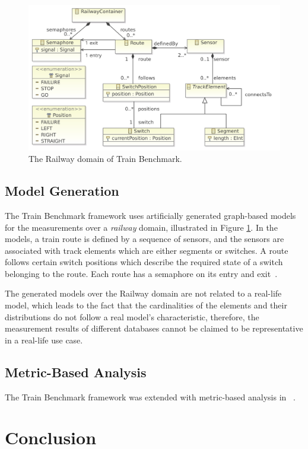 \begin{figure}[!ht]
	\centering
	\includegraphics[width=150mm, keepaspectratio]{figures/railway-containments.pdf}
	\caption{The Railway domain of Train Benchmark.}
	\label{fig:tb_domain}
\end{figure}

\subsection{Model Generation}

The Train Benchmark framework uses artificially generated graph-based models for the measurements over a \textit{railway} domain, illustrated in Figure \ref{fig:tb_domain}. In the models, a train route is defined by a sequence of sensors, and the sensors are associated with track elements which are either segments or switches. A route follows certain switch positions which describe the required state of a switch belonging to the route. Each route has a semaphore on its entry and exit~\cite{train_ttc}.

The generated models over the Railway domain are not related to a real-life model, which leads to the fact that the cardinalities of the elements and their distributions do not follow a real model's characteristic, therefore, the measurement results of different databases cannot be claimed to be representative in a real-life use case.

\subsection{Metric-Based Analysis}

The Train Benchmark framework was extended with metric-based analysis in ~\cite{metric_ase}.


\section{Conclusion} \label{sec:benchmark_conclusions}

